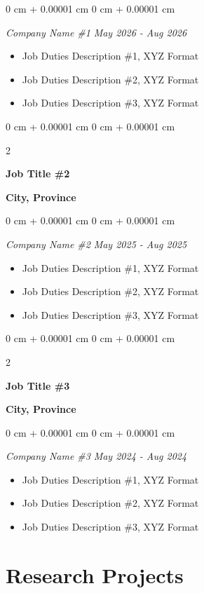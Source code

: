 \documentclass[10pt, letterpaper]{article}
\newenvironment{highlights}{
    \begin{itemize}[
        topsep=0.05 cm,
        parsep=0.10 cm,
        partopsep=0pt,
        itemsep=0pt,
        leftmargin=0 cm + 10pt
    ]
}{
    \end{itemize}
} %
\newenvironment{onecolentry}{
    \begin{adjustwidth}{
        0 cm + 0.00001 cm
    }{
        0 cm + 0.00001 cm
    }
}{
    \end{adjustwidth}
} %
\newenvironment{twocolentry}[2][]{
    \onecolentry
    \def\secondColumn{#2}
    \setcolumnwidth{\fill, 4.5 cm}
    \begin{paracol}{2}
}{
    \switchcolumn \raggedleft \secondColumn
    \end{paracol}
    \endonecolentry
} %
\begin{document}
    \begin{onecolentry}
    \textit{Company Name \#1}
    \hfill \textit{May 2026 - Aug 2026}
    \begin{highlights}
      \item Job Duties Description \#1, XYZ Format
      \item Job Duties Description \#2, XYZ Format
      \item Job Duties Description \#3, XYZ Format
    \end{highlights}
    \end{onecolentry}

        \begin{twocolentry}{
            \textbf{City, Province}}
            {\textbf{Job Title \#2}
            }
        \end{twocolentry}

    \begin{onecolentry}
    \textit{Company Name \#2}
    \hfill \textit{May 2025 - Aug 2025}
    \begin{highlights}
      \item Job Duties Description \#1, XYZ Format
      \item Job Duties Description \#2, XYZ Format
      \item Job Duties Description \#3, XYZ Format
    \end{highlights}
    \end{onecolentry}


        \begin{twocolentry}{
            \textbf{City, Province}}
            {\textbf{Job Title \#3}
            }
        \end{twocolentry}

    \begin{onecolentry}
    \textit{Company Name \#3}
    \hfill \textit{May 2024 - Aug 2024}
    \begin{highlights}
      \item Job Duties Description \#1, XYZ Format
      \item Job Duties Description \#2, XYZ Format
      \item Job Duties Description \#3, XYZ Format
    \end{highlights}
    \end{onecolentry}
    
    \section{Research Projects}
\end{document}
